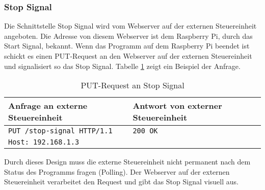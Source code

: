 \subsubsection{Stop Signal}
Die Schnittstelle Stop Signal wird vom Webserver auf der externen Steuereinheit angeboten. Die Adresse von diesem Webserver ist dem Raspberry Pi, durch das Start Signal, bekannt. Wenn das Programm auf dem Raspberry Pi beendet ist schickt es einen PUT-Request an den Webserver auf der externen Steuereinheit und signalisiert so das Stop Signal. Tabelle \ref{tab:put-stop-signal} zeigt ein Beispiel der Anfrage.

\begin{table}[h!]
	\centering
	\begin{tabular}{|l|l|}
		\hline Anfrage an externe Steuereinheit	 & Antwort von externer Steuereinheit \\ 
		\hline \verb|PUT /stop-signal HTTP/1.1|  & \verb|200 OK| 					  \\
			   \verb|Host: 192.168.1.3| 		 & 							          \\
		\hline 
	\end{tabular} 
	\caption{PUT-Request an Stop Signal}
	\label{tab:put-stop-signal}
\end{table}

Durch dieses Design muss die externe Steuereinheit nicht permanent nach dem Status des Programms fragen (Polling). Der Webserver auf der externen Steuereinheit verarbeitet den Request und gibt das Stop Signal visuell aus.
